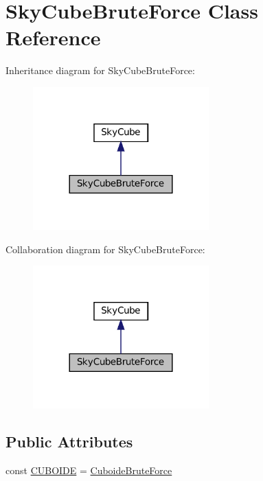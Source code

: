 \hypertarget{class_sky_cube_brute_force}{}\section{Sky\+Cube\+Brute\+Force Class Reference}
\label{class_sky_cube_brute_force}


Inheritance diagram for Sky\+Cube\+Brute\+Force\+:\nopagebreak
\begin{figure}[H]
\begin{center}
\leavevmode
\includegraphics[width=192pt]{class_sky_cube_brute_force__inherit__graph}
\end{center}
\end{figure}


Collaboration diagram for Sky\+Cube\+Brute\+Force\+:\nopagebreak
\begin{figure}[H]
\begin{center}
\leavevmode
\includegraphics[width=192pt]{class_sky_cube_brute_force__coll__graph}
\end{center}
\end{figure}
\subsection*{Public Attributes}
\begin{DoxyCompactItemize}
\item 
const \hyperlink{class_sky_cube_brute_force_aab388dcdfbb6d0151f40f93faec35db2}{C\+U\+B\+O\+I\+DE} = \textquotesingle{}\hyperlink{class_cuboide_brute_force}{Cuboide\+Brute\+Force}\textquotesingle{}
\end{DoxyCompactItemize}
